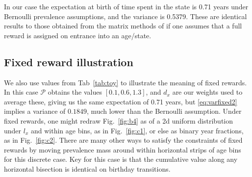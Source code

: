\documentclass{bmcart}
\begin{document}
In our case the expectation at birth of time spent in the state is 0.71 years under Bernoulli prevalence assumptions, and the variance is 0.5379. These are identical results to those obtained from the matrix methods of \cite{caswell2018matrix} if one assumes that a full reward is assigned on entrance into an age/state.

\subsection{Fixed reward illustration}
We also use values from Tab~\ref{tab:toy} to illustrate the meaning of fixed rewards. In this case $\mathcal{P}$ obtains the values $[0.1,0.6,1.3]$, and $d_x$ are our weights used to average these, giving us the same expectation of 0.71 years, but \eqref{eq:varfixed2} implies a variance of $0.1849$, much lower than the Bernoulli assumption. Under fixed rewards, one might redraw Fig.~\ref{fig:b4} as of a 2d uniform distribution under $l_x$ and within age bins, as in Fig.~\ref{fig:c1}, or else as binary year fractions, as in Fig.~\ref{fig:c2}. There are many other ways to satisfy the constraints of fixed rewards by moving prevalence mass around within horizontal strips of age bins for this discrete case. Key for this case is that the cumulative value along any horizontal bisection is identical on birthday transitions.
\end{document}
